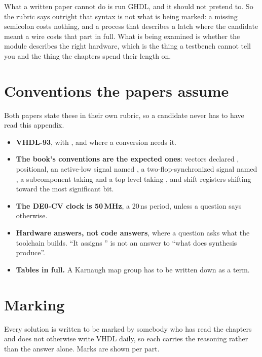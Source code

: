 What a written paper cannot do is run GHDL, and it should not pretend to. So the rubric says
outright that syntax is not what is being marked: a missing semicolon costs nothing, and a process
that describes a latch where the candidate meant a wire costs that part in full. What is being
examined is whether the module describes the right hardware, which is the thing a testbench cannot
tell you and the thing the chapters spend their length on.

\section*{Conventions the papers assume}
Both papers state these in their own rubric, so a candidate never has to have read this appendix.
\begin{itemize}
  \item \textbf{VHDL-93}, with , and  where a
    conversion needs it.
  \item \textbf{The book's conventions are the expected ones}: vectors declared ,
     positional, an active-low signal named , a two-flop-synchronized signal
    named , a subcomponent taking  and a top level taking
    , and shift registers shifting toward the most significant bit.
  \item \textbf{The DE0-CV clock is 50\,MHz}, a 20\,ns period, unless a question says otherwise.
  \item \textbf{Hardware answers, not code answers}, where a question asks what the toolchain
    builds. ``It assigns '' is not an answer to ``what does synthesis produce''.
  \item \textbf{Tables in full.} A Karnaugh map group has to be written down as a term.
\end{itemize}

\section*{Marking}
Every solution is written to be marked by somebody who has read the chapters and does not otherwise
write VHDL daily, so each carries the reasoning rather than the answer alone. Marks are shown per
part.

